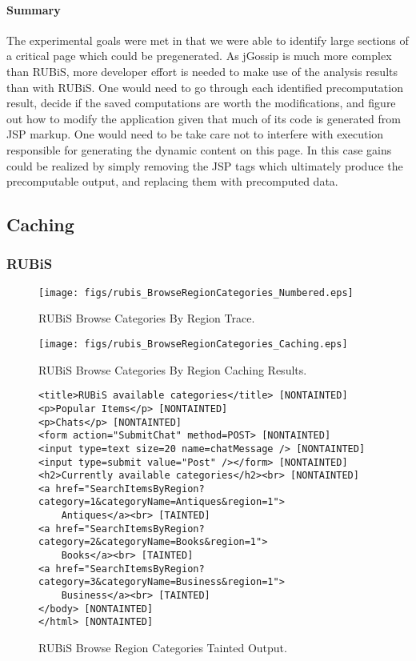 \documentclass[msc,oneside]{ubcthesis}
\begin{document}
\paragraph{Summary}
The experimental goals were met in that we were able to identify large sections of a critical page which could be pregenerated. As jGossip is much more complex than RUBiS, more developer effort is needed to make use of the analysis results than with RUBiS. One would need to go through each identified precomputation result, decide if the saved computations are worth the modifications, and figure out how to modify the application given that much of its code is generated from JSP markup. One would need to be take care not to interfere with execution responsible for generating the dynamic content on this page. In this case gains could be realized by simply removing the JSP tags which ultimately produce the precomputable output, and replacing them with precomputed data.

\subsection{Caching}
\label{ana:caching}
\subsubsection{RUBiS}

\begin{sidewaysfigure}
\centering
\scalebox{0.43}
{\texttt{[image: figs/rubis\_BrowseRegionCategories\_Numbered.eps]}}
\caption{RUBiS Browse Categories By Region Trace.} 
\label{fig:browseregioncategories}
\end{sidewaysfigure}

\begin{sidewaysfigure}
\centering
\scalebox{0.41}
{\texttt{[image: figs/rubis\_BrowseRegionCategories\_Caching.eps]}}
\caption{RUBiS Browse Categories By Region Caching Results.} 
\label{fig:browseregioncategoriescaching}
\end{sidewaysfigure}

\begin{figure}[ht]
  \caption{\label{fig:browseregioncategoriesto} RUBiS Browse Region Categories Tainted Output.}
\begin{verbatim}
<title>RUBiS available categories</title> [NONTAINTED]
<p>Popular Items</p> [NONTAINTED]
<p>Chats</p> [NONTAINTED]
<form action="SubmitChat" method=POST> [NONTAINTED]
<input type=text size=20 name=chatMessage /> [NONTAINTED]
<input type=submit value="Post" /></form> [NONTAINTED]
<h2>Currently available categories</h2><br> [NONTAINTED]
<a href="SearchItemsByRegion?category=1&categoryName=Antiques&region=1">
    Antiques</a><br> [TAINTED]
<a href="SearchItemsByRegion?category=2&categoryName=Books&region=1">
    Books</a><br> [TAINTED]
<a href="SearchItemsByRegion?category=3&categoryName=Business&region=1">
    Business</a><br> [TAINTED]
</body> [NONTAINTED]
</html> [NONTAINTED]
\end{verbatim}
\end{figure}
\end{document}
